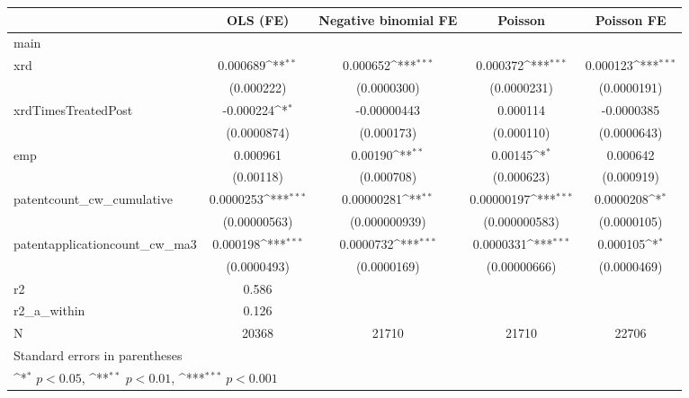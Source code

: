 {
\def\sym#1{\ifmmode^{#1}\else\(^{#1}\)\fi}
\begin{tabular}{l*{4}{c}}
\hline\hline
            &\multicolumn{1}{c}{OLS (FE)}&\multicolumn{1}{c}{Negative binomial FE}&\multicolumn{1}{c}{Poisson}&\multicolumn{1}{c}{Poisson FE}\\
\hline
main        &                     &                     &                     &                     \\
xrd         &    0.000689\sym{**} &    0.000652\sym{***}&    0.000372\sym{***}&    0.000123\sym{***}\\
            &  (0.000222)         & (0.0000300)         & (0.0000231)         & (0.0000191)         \\
[1em]
xrdTimesTreatedPost&   -0.000224\sym{*}  & -0.00000443         &    0.000114         &  -0.0000385         \\
            & (0.0000874)         &  (0.000173)         &  (0.000110)         & (0.0000643)         \\
[1em]
emp         &    0.000961         &     0.00190\sym{**} &     0.00145\sym{*}  &    0.000642         \\
            &   (0.00118)         &  (0.000708)         &  (0.000623)         &  (0.000919)         \\
[1em]
patentcount\_cw\_cumulative&   0.0000253\sym{***}&  0.00000281\sym{**} &  0.00000197\sym{***}&   0.0000208\sym{*}  \\
            &(0.00000563)         &(0.000000939)         &(0.000000583)         & (0.0000105)         \\
[1em]
patentapplicationcount\_cw\_ma3&    0.000198\sym{***}&   0.0000732\sym{***}&   0.0000331\sym{***}&    0.000105\sym{*}  \\
            & (0.0000493)         & (0.0000169)         &(0.00000666)         & (0.0000469)         \\
\hline
r2          &       0.586         &                     &                     &                     \\
r2\_a\_within &       0.126         &                     &                     &                     \\
N           &       20368         &       21710         &       21710         &       22706         \\
\hline\hline
\multicolumn{5}{l}{\footnotesize Standard errors in parentheses}\\
\multicolumn{5}{l}{\footnotesize \sym{*} \(p<0.05\), \sym{**} \(p<0.01\), \sym{***} \(p<0.001\)}\\
\end{tabular}
}
